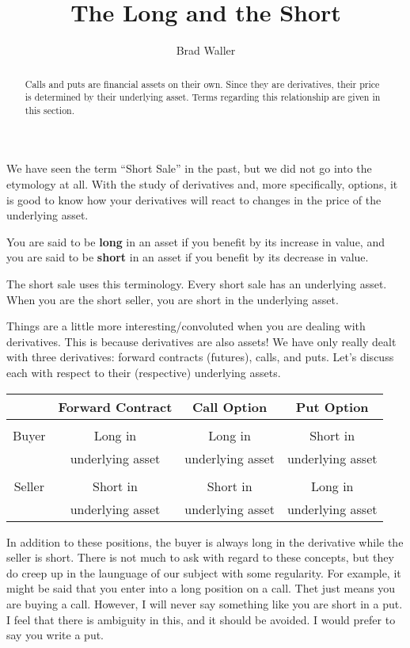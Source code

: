 \documentclass{ximera}
\author{Brad Waller}
\title{The Long and the Short}
\begin{document}
\begin{abstract}
Calls and puts are financial assets on their own. Since they are derivatives, their price is determined by their underlying asset. Terms regarding this relationship are given in this section.
\end{abstract}

\maketitle

We have seen the term ``Short Sale'' in the past, but we did not go into the etymology at all. With the study of derivatives and, more specifically, options, it is good to know how your derivatives will react to changes in the price of the underlying asset. 

\begin{definition}
You are said to be {\bf long} in an asset if you benefit by its increase in value, and you are said to be {\bf short} in an asset if you benefit by its decrease in value.
\end{definition}

The short sale uses this terminology. Every short sale has an underlying asset. When you are the short seller, you are short in the underlying asset. 

Things are a little more interesting/convoluted when you are dealing with derivatives. This is because derivatives are also assets! We have only really dealt with three derivatives: forward contracts (futures), calls, and puts. Let's discuss each with respect to their (respective) underlying assets.

\begin{center}
\begin{tabular}{cccc}

& Forward Contract & Call Option & Put Option\\
\hline
	&			&			&		\\
Buyer & Long in 		& Long in 		& Short in 	\\
	& underlying asset	& underlying asset 	& underlying asset\\
	&			&			&		\\
Seller	& Short in 		& Short in 		& Long in\\
	& underlying asset 	& underlying asset 	& underlying asset
\end{tabular}
\end{center}

In addition to these positions, the buyer is always long in the derivative while the seller is short. There is not much to ask with regard to these concepts, but they do creep up in the launguage of our subject with some regularity. For example, it might be said that you enter into a long position on a call. Thet just means you are buying a call. However, I will never say something like you are short in a put. I feel that there is ambiguity in this, and it should be avoided. I would prefer to say you write a put.
\end{document}
